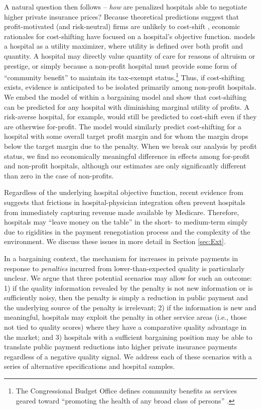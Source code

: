 \documentclass[12pt]{article}
\begin{document}
A natural question then follows -- \textit{how} are penalized hospitals able to negotiate higher private insurance prices? Because theoretical predictions suggest that profit-motivated (and risk-neutral) firms are unlikely to cost-shift \citep{hay1983}, economic rationales for cost-shifting have focused on a hospital's objective function. \cite{dranove1988} models a hospital as a utility maximizer, where utility is defined over both profit and quantity.  A hospital may directly value quantity of care for reasons of altruism or prestige, or simply because a non-profit hospital must provide some form of ``community benefit'' to maintain its tax-exempt status.\footnote{The Congressional Budget Office defines community benefits as services geared toward ``promoting the health of any broad class of persons'' \citep{cbo2006}.}  Thus, if cost-shifting exists, evidence is anticipated to be isolated primarily among non-profit hospitals. We embed the model of \cite{dranove1988} within a bargaining model \citep{ho2017} and show that cost-shifting can be predicted for any hospital with diminishing marginal utility of profits. A risk-averse hospital, for example, would still be predicted to cost-shift even if they are otherwise for-profit. The model would similarly predict cost-shifting for a hospital with some overall target profit margin and for whom the margin drops below the target margin due to the penalty. When we break our analysis by profit status, we find no economically meaningful difference in effects among for-profit and non-profit hospitals, although our estimates are only significantly different than zero in the case of non-profits.

Regardless of the underlying hospital objective function, recent evidence from \citet{sacarny2018} suggests that frictions in hospital-physician integration often prevent hospitals from immediately capturing revenue made available by Medicare. Therefore, hospitals may ``leave money on the table'' in the short- to medium-term simply due to rigidities in the payment renegotiation process and the complexity of the environment. We discuss these issues in more detail in Section \ref{sec:Ext}.

In a bargaining context, the mechanism for increases in private payments in response to \textit{penalties} incurred from lower-than-expected quality is particularly unclear. We argue that three potential scenarios may allow for such an outcome: 1) if the quality information revealed by the penalty is not new information or is sufficiently noisy, then the penalty is simply a reduction in public payment and the underlying source of the penalty is irrelevant; 2) if the information is new and meaningful, hospitals may exploit the penalty in other service areas (i.e., those not tied to quality scores) where they have a comparative quality advantage in the market; and 3)  hospitals with a sufficient bargaining position may be able to translate public payment reductions into higher private insurance payments regardless of a negative quality signal. We address each of these scenarios with a series of alternative specifications and hospital samples.
\end{document}
